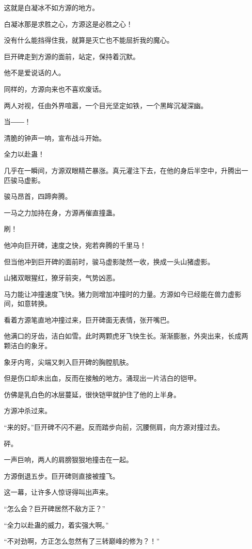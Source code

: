 \begin{this_body}
这就是白凝冰不如方源的地方。

白凝冰那是求胜之心，方源这是必胜之心！

没有什么能挡得住我，就算是灭亡也不能屈折我的魔心。

巨开碑走到方源的面前，站定，保持着沉默。

他不是爱说话的人。

同样的，方源向来也不喜欢废话。

两人对视，任由外界喧嚣，一个目光坚定如铁，一个黑眸沉凝深幽。

当――！

清脆的钟声一响，宣布战斗开始。

全力以赴蛊！

几乎在一瞬间，方源双眼精芒暴涨。真元灌注下去，在他的身后半空中，升腾出一匹骏马虚影。

骏马昂首，四蹄奔腾。

一马之力加持在身，方源再催直撞蛊。

刷！

他冲向巨开碑，速度之快，宛若奔腾的千里马！

但当他冲到巨开碑的面前时，骏马虚影陡然一收，换成一头山猪虚影。

山猪双眼猩红，獠牙前突，气势凶恶。

马力能让冲撞速度飞快。猪力则增加冲撞时的力量。方源如今已经能在兽力虚影间，如意转换。

看着方源笔直地冲撞过来，巨开碑面无表情，张开嘴巴。

他满口的牙齿，洁白如雪。此时两颗虎牙飞快生长。渐渐膨胀，外突出来，长成两颗洁白的象牙。

象牙内弯，尖端又刺入巨开碑的胸膛肌肤。

但是伤口却未出血，反而在接触的地方。涌现出一片洁白的铠甲。

仿佛是乳白色的冰层蔓延，很快铠甲就护住了他的上半身。

方源冲杀过来。

“来的好。”巨开碑不闪不避。反而踏步向前，沉腰侧肩，向方源对撞过去。

砰。

一声巨响，两人的肩膀狠狠地撞击在一起。

方源倒退五步。巨开碑则直接被撞飞。

这一幕，让许多人惊讶得叫出声来。

“怎么会？巨开碑居然不敌方正？”

“全力以赴蛊的威力，着实强大啊。”

“不对劲啊，方正怎么忽然有了三转巅峰的修为？！”


\end{this_body}
